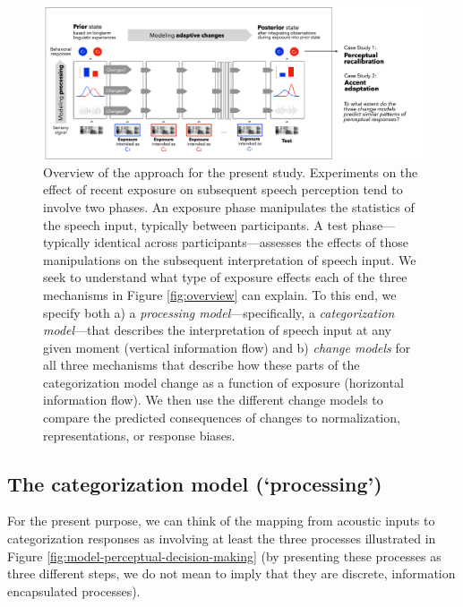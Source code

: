 \documentclass[
  11pt,
  english,
  man,floatsintext]{apa6}
\begin{document}
\begin{figure}[h]
\begin{center}
\includegraphics[width=.99\columnwidth]{../figures/diagrams/overview-of-changes.png}
\caption{Overview of the approach for the present study. Experiments on the effect of recent exposure on subsequent speech perception tend to involve two phases. An exposure phase manipulates the statistics of the speech input, typically between participants. A test phase---typically identical across participants---assesses the effects of those manipulations on the subsequent interpretation of speech input. We seek to understand what type of exposure effects each of the three mechanisms in Figure \ref{fig:overview} can explain. To this end, we specify both a) a {\em processing model}---specifically, a {\em categorization model}---that describes the interpretation of speech input at any given moment (vertical information flow) and b) {\em change models} for all three mechanisms that describe how these parts of the categorization model change as a function of exposure (horizontal information flow). We then use the different change models to compare the predicted consequences of changes to normalization, representations, or response biases.}\label{fig:overview-change}
\end{center}
\end{figure}

\hypertarget{the-categorization-model-processing}{%
\subsection{The categorization model (`processing')}\label{the-categorization-model-processing}}

For the present purpose, we can think of the mapping from acoustic inputs to categorization responses as involving at least the three processes illustrated in Figure \ref{fig:model-perceptual-decision-making} (by presenting these processes as three different steps, we do not mean to imply that they are discrete, information encapsulated processes).
\end{document}
